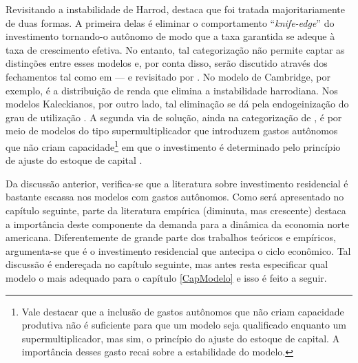 Revisitando a instabilidade de Harrod, \textcite{allain_macroeconomic_2014} destaca que foi tratada majoritariamente de duas formas. A primeira delas é eliminar o comportamento  ``\textit{knife-edge}'' do investimento tornando-o autônomo de modo que a taxa garantida se adeque à taxa de crescimento efetiva. No entanto, tal categorização não permite captar as distinções entre esses modelos e, por conta disso, serão discutido através dos fechamentos tal como em \textcite{serrano_long_1995} --- e revisitado por \textcite{serrano_har_2018}. No modelo de Cambridge, por exemplo, é a distribuição de renda que elimina a instabilidade harrodiana. Nos modelos Kaleckianos, por outro lado, tal eliminação  se dá pela endogeinização do grau de utilização
.
A segunda via de solução, ainda na categorização de \textcite{allain_macroeconomic_2014}, é por meio de modelos do tipo supermultiplicador que introduzem gastos autônomos que não criam capacidade\footnote{Vale destacar que a inclusão de gastos autônomos que não criam capacidade produtiva não é suficiente para que um modelo seja qualificado enquanto um supermultiplicador, mas sim, o princípio do ajuste do estoque de capital. A importância desses gasto recai sobre a estabilidade do modelo.} em que o investimento é determinado pelo princípio de ajuste do estoque de capital \cites{serrano_long_1995}{serrano_sraffian_1995}{bortis_institutions_1996}
.




Da discussão anterior, verifica-se que a literatura sobre investimento residencial é bastante escassa nos modelos com gastos autônomos. Como será apresentado no capítulo seguinte, parte da literatura empírica (diminuta, mas crescente) destaca a importância deste componente da demanda para a dinâmica da economia norte americana. Diferentemente de grande parte dos trabalhos teóricos e empíricos, argumenta-se que é o investimento residencial que antecipa o ciclo econômico. Tal discussão é endereçada no capítulo seguinte, mas antes resta especificar qual modelo o mais adequado para o capítulo \ref{CapModelo} e isso é feito a seguir.




